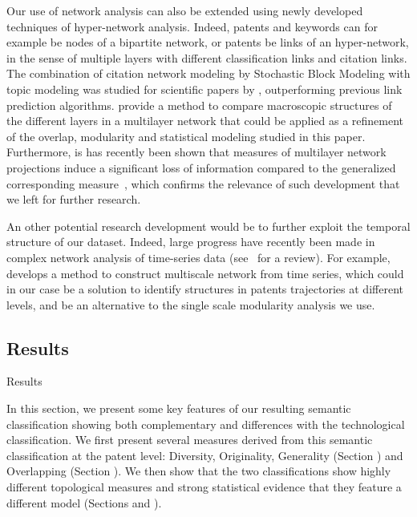 Our use of network analysis can also be extended using newly developed techniques of hyper-network analysis. Indeed, patents and keywords can for example be nodes of a bipartite network, or patents be links of an hyper-network, in the sense of multiple layers with different classification links and citation links. The combination of citation network modeling by Stochastic Block Modeling with topic modeling was studied for scientific papers by \cite{zhu2013scalable}, outperforming previous link prediction algorithms. \cite{iacovacci2015mesoscopic} provide a method to compare macroscopic structures of the different layers in a multilayer network that could be applied as a refinement of the overlap, modularity and statistical modeling studied in this paper. Furthermore, is has recently been shown that measures of multilayer network projections induce a significant loss of information compared to the generalized corresponding measure~\cite{de2015ranking}, which confirms the relevance of such development that we left for further research.

An other potential research development would be to further exploit the temporal structure of our dataset. Indeed, large progress have recently been made in complex network analysis of time-series data (see~\cite{gao2017complex} for a review). For example,~\cite{gao2015multiscale} develops a method to construct multiscale network from time series, which could in our case be a solution to identify structures in patents trajectories at different levels, and be an alternative to the single scale modularity analysis we use.



\subsection*{Results \label{result}}{Results}

In this section, we present some key features of our resulting semantic classification showing both complementary and differences with the technological classification. We first present several measures derived from this semantic classification at the patent level: Diversity, Originality, Generality (Section ) and Overlapping (Section ). We then show that the two classifications show highly
different topological measures and strong statistical evidence that they feature a different model (Sections  and ).

